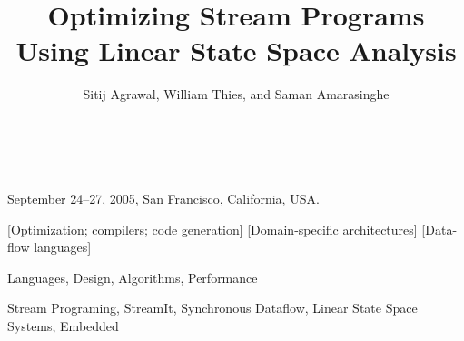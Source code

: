 \documentclass{sig-alternate}
\begin{document}
   {September 24--27, 2005, San Francisco, California, USA.}

  \title{Optimizing Stream Programs \\ Using Linear State Space Analysis \\ \vspace{-12pt}}
  \author{\alignauthor Sitij Agrawal, William Thies, and Saman Amarasinghe \\[0.4Ex]
     \\[0.2Ex]
     \\[-0.3Ex]
    }

  
  \maketitle

  \begin{abstract}
    
  \end{abstract}
  
  \vspace{-1pt}
  [Optimization; compilers; code generation]
  [Domain-specific architectures]
  [Data-flow languages]
  
  \vspace{-4.5pt}
  \terms
  \vspace{-3pt}
  Languages, Design, Algorithms, Performance
  
  \vspace{-4.5pt}
  \keywords
  \vspace{-3pt} Stream Programing, StreamIt, Synchronous Dataflow,
  Linear State Space Systems, Embedded
  
\end{document}
